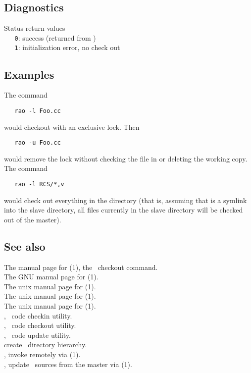 \subsection*{Diagnostics}
 
Status return values
\\ \verb+   0+:  success (returned from )
\\ \verb+   1+:  initialization error, no check out

\subsection*{Examples}
 
The command
 
\begin{verbatim}
   rao -l Foo.cc
\end{verbatim}
 
\noindent
would checkout  with an exclusive lock.  Then
 
\begin{verbatim}
   rao -u Foo.cc
\end{verbatim}
 
\noindent
would remove the lock without checking the file in or deleting the working
copy.  The command
 
\begin{verbatim}
   rao -l RCS/*,v
\end{verbatim}
 
\noindent
would check out everything in the directory (that is, assuming that 
is a symlink into the slave directory, all files currently in the slave
directory will be checked out of the master).
 
\subsection*{See also}
 
The manual page for (1), the \rcs\ checkout command.\\
The GNU manual page for (1).\\
The unix manual page for (1).\\
The unix manual page for (1).\\
The unix manual page for (1).\\
, \aipspp\ code checkin utility.\\
, \aipspp\ code checkout utility.\\
, \aipspp\ code update utility.\\
 create \aipspp\ directory hierarchy.\\
, invoke  remotely via (1).\\
, update \aipspp\ sources from the master via (1).

